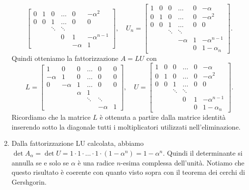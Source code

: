 \documentclass[a4paper]{report}
\theoremstyle{definiton}
\theoremstyle{remark}
\begin{document}
\begin{enumerate}
\[\begin{bmatrix}
            0 & 1 & 0 & \dots & 0 & -\alpha^2\\
            0& 0 & 1 & \dots  & 0 & 0\\
            & & \ddots & \ddots\\
            & & & 0 & 1 & -\alpha^{n-1}\\
            & & &  &-\alpha & 1      
        \end{bmatrix},
        \quad
        U_n = \begin{bmatrix}
            1  & 0 &  0& \dots  & 0 &  -\alpha\\
            0 & 1 & 0 & \dots & 0 & -\alpha^2\\
            0& 0 & 1 & \dots  & 0 & 0\\
            & & \ddots & \ddots\\
            & & & -\alpha & 1 & -\alpha^{n-1}\\
            & & &  & 0 & 1-\alpha_n
        \end{bmatrix}.
    \]
    Quindi otteniamo la fattorizzazione $A=LU$ con
    \[
        L = \begin{bmatrix}
            1  & 0 &  0& \dots  & 0 &  0\\
            -\alpha & 1 & 0 & \dots & 0 & 0\\
            0& -\alpha & 1 & \dots  & 0 & 0\\
            & & \alpha & 1\\
            & & & \ddots & \ddots & \\
            & & &  &-\alpha & 1      
        \end{bmatrix}, \quad U = \begin{bmatrix}
            1  & 0 &  0& \dots  & 0 &  -\alpha\\
            0 & 1 & 0 & \dots & 0 & -\alpha^2\\
            0& 0 & 1 & \dots  & 0 & 0\\
            & & \ddots & \ddots\\
            & & & 0 & 1 & -\alpha^{n-1}\\
            & & &  & 0 & 1-\alpha_n
        \end{bmatrix}.
    \]
    Ricordiamo che la matrice $L$ è ottenuta a partire dalla matrice identità inserendo sotto la diagonale tutti i moltiplicatori utilizzati nell'eliminazione.
    \item Dalla fattorizzazione LU calcolata, abbiamo $\det A_\alpha = \det U = 1\cdot 1 \cdot \dots \cdot 1 \cdot (1-\alpha^n) = 1-\alpha^n$. Quindi il determinante si annulla se e solo se $\alpha$ è una radice $n$-esima complessa dell'unità. Notiamo che questo risultato è coerente con quanto visto sopra con il teorema dei cerchi di Gershgorin.
\end{enumerate}
\end{document}
